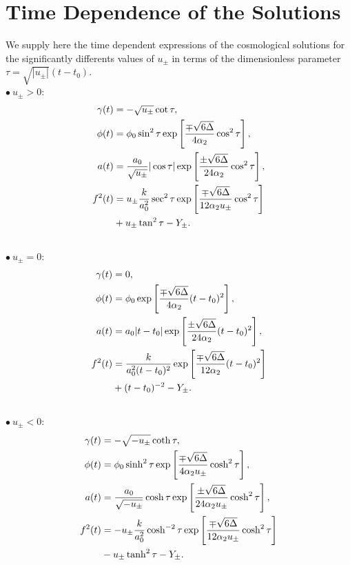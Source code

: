 \documentclass[aps,prd,12pt,superscriptaddress,showpacs,showkeys,longbibliography,reprint]{revtex4-1}
\begin{document}
\section{Time Dependence of the Solutions}\label{solutions t}
We supply here the time dependent expressions of the cosmological solutions for the significantly differents values of $u_\pm$ in terms of the dimensionless parameter $\tau=\sqrt{|u_\pm|}(t-t_0)$.\\
\newline
$\bullet\ u_\pm>0$:
\begin{align}
  \gamma(t)&=-\sqrt{u_\pm}\cot\tau,\\
  \phi(t)&=\phi_0\sin^2\tau\exp\left[\frac{\mp\sqrt{6\Delta}}{4\alpha_2}\cos^2\tau\right],\\
  a(t)&=\frac{a_0}{\sqrt{u_\pm}}|\cos\tau|\exp\left[\frac{\pm\sqrt{6\Delta}}{24\alpha_2}\cos^2\tau\right],\\
  f^2(t)&=u_\pm\frac{k}{a_0^2}\sec^2\tau\exp\left[\frac{\mp\sqrt{6\Delta}}{12\alpha_2u_\pm}\cos^2\tau\right]\notag\\
  &+u_\pm\tan^2\tau-Y_\pm.
\end{align}
\\
\medskip
$\bullet\ u_\pm=0$:
\begin{align}
  \gamma(t)&=0,\\
  \phi(t)&=\phi_0\exp\left[\frac{\mp\sqrt{6\Delta}}{4\alpha_2}(t-t_0)^2\right],\\
  a(t)&=a_0|t-t_0|\exp\left[\frac{\pm\sqrt{6\Delta}} {24\alpha_2}(t-t_0)^2\right],\\
  f^2(t)&=\frac{k}{a_0^2(t-t_0)^2}\exp\left[\frac{\mp\sqrt{6\Delta}}{12\alpha_2}(t-t_0)^2\right]\notag\\
  &+(t-t_0)^{-2}-Y_\pm.
\end{align}
\\
\medskip
$\bullet\ u_\pm<0$:
\begin{align}
  \gamma(t)&=-\sqrt{-u_\pm}\coth\tau,\\
  \phi(t)&=\phi_0\sinh^2\tau\exp\left[\frac{\mp\sqrt{6\Delta}}{4\alpha_2u_\pm}\cosh^2\tau\right],\\
  a(t)&=\frac{a_0}{\sqrt{-u_\pm}}\cosh\tau\exp\left[\frac{\pm\sqrt{6\Delta}} {24\alpha_2u_\pm}\cosh^2\tau\right],\\
  f^2(t)&=-u_\pm\frac{k}{a_0^2}\cosh^{-2}\tau\exp\left[\frac{\mp\sqrt{6\Delta}}{12\alpha_2u_\pm}\cosh^2\tau\right]\notag\\
  &-u_\pm\tanh^2\tau-Y_\pm.
\end{align}

\end{document}
